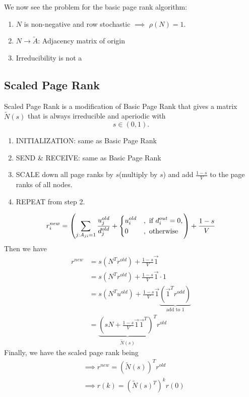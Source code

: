 \begin{problem}
We now see the problem for the basic page rank algorithm:
\begin{enumerate}
	\item \(N\) is non-negative and row stochastic \(\implies\) \(\rho(N) = 1\).
	\item \(N \to \widetilde{A}\): Adjacency matrix of origin
	\item Irreducibility is not a
\end{enumerate}
\end{problem}

\subsection{Scaled Page Rank}
Scaled Page Rank is a modification of Basic Page Rank that gives a matrix \(\widetilde{N}(s)\) that is always irreducible and aperiodic with
\[
	s\in \left( 0, 1 \right).
\]
\begin{enumerate}
	\item INITIALIZATION: same as Basic Page Rank
	\item SEND \& RECEIVE: same as Basic Page Rank
	\item SCALE down all page ranks by \(s\)(multiply by \(s\)) and add \(\frac{1-s}{V}\) to the page ranks of all nodes.
	\item REPEAT from step 2.
\end{enumerate}

\[
	r_{i}^{new} = \left(\sum\limits_{j:A_{ji} = 1} \frac{u_{j}^{old}}{d_{j}^{old}}+\begin{dcases}
		u_{i}^{old} & , \text{ if }d_{i}^{out} = 0, \\
		0           & , \text{ otherwise}
	\end{dcases}\right)+\frac{1-s}{V}
\]
Then we have
\[
	\begin{split}
		r^{new} &= s(N^{T}r^{old})+\frac{1-s}{V}\vec{1}\\
		&= s(N^{T}r^{old})+\frac{1-s}{V}\vec{1}\cdot 1\\
		&= s(N^{T}u^{old}) + \frac{1-s}{V}\vec{1} \underbrace{(\vec{1}^{T}r^{odd})}_{\text{add to }1}\\
		&= \underbrace{(sN + \frac{1-s}{V}\vec{1}\vec{1}^{T})^{T}}_{\widetilde{N}(s)} r^{old}
	\end{split}
\]
Finally, we have the scaled page rank being
\[
	\begin{split}
		&\implies r^{new} = (\widetilde{N}(s))^{T}r^{old}\\
		&\implies r(k) = (\widetilde{N}(s)^{T})^k r(0)
	\end{split}
\]

